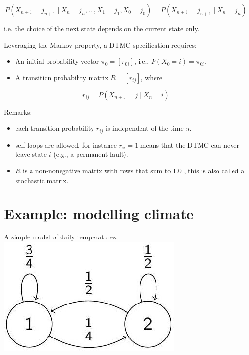 \documentclass[10pt]{article}
\begin{document}
$$
P\left(X_{n+1}=j_{n+1} \mid X_{n}=j_{n}, \ldots, X_{1}=j_{1}, X_{0}=j_{0}\right)=P\left(X_{n+1}=j_{n+1} \mid X_{n}=j_{n}\right)
$$

i.e. the choice of the next state depends on the current state only.

Leveraging the Markov property, a DTMC specification requires:

\begin{itemize}
  \item An initial probability vector $\pi_{0}=\left[\pi_{0 i}\right]$, i.e., $P\left(X_{0}=i\right)=\pi_{0 i}$.
  \item A transition probability matrix $R=\left[r_{i j}\right]$, where
\end{itemize}

$$
r_{i j}=P\left(X_{n+1}=j \mid X_{n}=i\right)
$$

Remarks:

\begin{itemize}
  \item each transition probability $r_{i j}$ is independent of the time $n$.
  \item self-loops are allowed, for instance $r_{i i}=1$ means that the DTMC can never leave state $i$ (e.g., a permanent fault).
  \item $R$ is a non-nonegative matrix with rows that sum to 1.0 , this is also called a stochastic matrix.
\end{itemize}

\section*{Example: modelling climate}
A simple model of daily temperatures:\\
\includegraphics[max width=\textwidth, center]{2025_05_11_84d245f69223a25e0522g-40}
\end{document}
